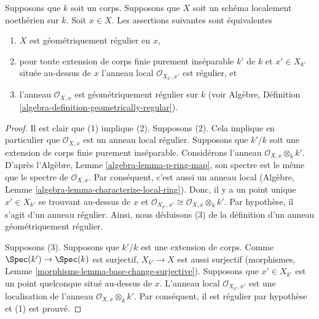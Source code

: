 \begin{lemma}
\label{lemma-geometrically-regular-at-point}
Supposons que $k$ soit un corps.
Supposons que $X$ soit un schéma
localement noethérien sur $k$. Soit $x \in
X$. Les assertions suivantes sont équivalentes
\begin{enumerate}
\item $X$ est géométriquement régulier en $x$, \item
pour toute extension de corps finie purement
inséparable $k'$ de $k$ et $x' \in X_{k'}$ située
au-dessus de $x$ l'anneau local $\mathcal{O}_{X_{k'},
x'}$ est régulier, et \item l'anneau $\mathcal{O}_{X,
x}$ est géométriquement régulier sur $k$ (voir Algèbre,
Définition \ref{algebra-definition-geometrically-regular}).
\end{enumerate}
\end{lemma}

\begin{proof}
Il est clair que (1) implique (2). Supposons (2). Cela implique
en particulier que $\mathcal{O}_{X, x}$ est un anneau local
régulier. Supposons que $k'/k$ soit une extension de corps finie
purement inséparable. Considérons l'anneau $\mathcal{O}_{X, x}
\otimes_k k'$. D'après l'Algèbre, Lemme
\ref{algebra-lemma-p-ring-map}, son spectre est le même que le
spectre de $\mathcal{O}_{X, x}$. Par conséquent, c'est aussi un
anneau local (Algèbre, Lemme
\ref{algebra-lemma-characterize-local-ring}). Donc, il y a un point unique $x'
\in X_{k'}$ se trouvant au-dessus de $x$ et $\mathcal{O}_{X_{k'}, x'} \cong
\mathcal{O}_{X, x} \otimes_k k'$. Par hypothèse, il s'agit d'un anneau régulier.
Ainsi, nous déduisons (3) de la définition d'un anneau géométriquement régulier.

\medskip\noindent
Supposons (3). Supposons que $k'/k$ est une extension de
corps. Comme $\Spec(k') \to \Spec(k)$ est surjectif,
$X_{k'} \to X$ est aussi surjectif (morphismes, Lemme
\ref{morphisms-lemma-base-change-surjective}). Supposons que
$x' \in X_{k'}$ est un point quelconque situé au-dessus de
$x$. L'anneau local $\mathcal{O}_{X_{k'}, x'}$ est une
localisation de l'anneau $\mathcal{O}_{X, x} \otimes_k k'$.
Par conséquent, il est régulier par hypothèse et (1) est prouvé.
\end{proof}

